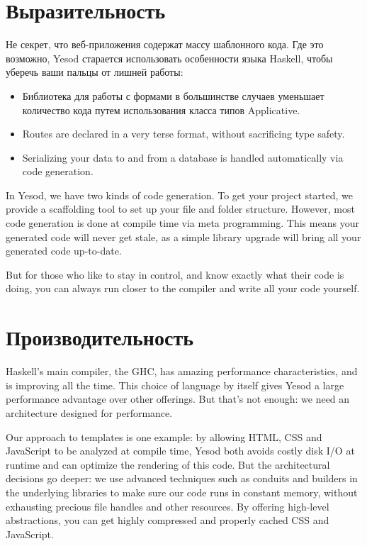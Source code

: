 \section{Выразительность}

Не секрет, что веб-приложения содержат массу шаблонного кода. Где это возможно, Yesod старается использовать особенности языка Haskell, чтобы уберечь ваши пальцы от лишней работы:

\begin{itemize}
  \item Библиотека для работы с формами в большинстве случаев уменьшает количество кода путем использования класса типов Applicative.
  \item Routes are declared in a very terse format, without sacrificing type safety.
  \item Serializing your data to and from a database is handled automatically via code generation.
\end{itemize}

In Yesod, we have two kinds of code generation. To get your project started, we provide a scaffolding tool to set up your file and folder structure. However, most code generation is done at compile time via meta programming. This means your generated code will never get stale, as a simple library upgrade will bring all your generated code up-to-date.

But for those who like to stay in control, and know exactly what their code is doing, you can always run closer to the compiler and write all your code yourself.

\section{Производительность}

Haskell's main compiler, the GHC, has amazing performance characteristics, and is improving all the time. This choice of language by itself gives Yesod a large performance advantage over other offerings. But that's not enough: we need an architecture designed for performance.

Our approach to templates is one example: by allowing HTML, CSS and JavaScript to be analyzed at compile time, Yesod both avoids costly disk I/O at runtime and can optimize the rendering of this code. But the architectural decisions go deeper: we use advanced techniques such as conduits and builders in the underlying libraries to make sure our code runs in constant memory, without exhausting precious file handles and other resources. By offering high-level abstractions, you can get highly compressed and properly cached CSS and JavaScript.

